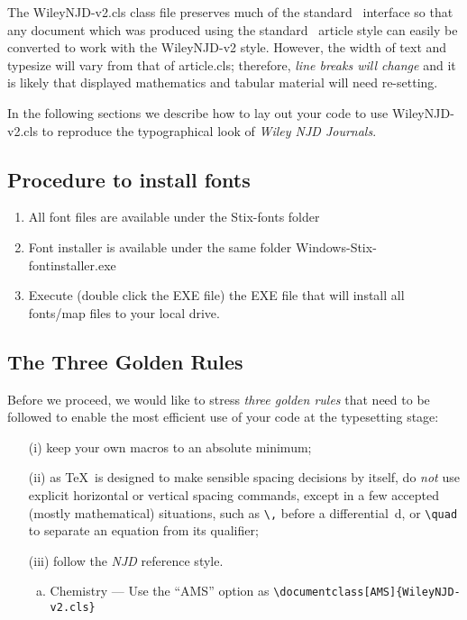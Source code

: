\documentclass[AMS,STIX1COL]{WileyNJD-v2}
\begin{document}
The \textsf{WileyNJD-v2.cls} class file preserves much of the standard
\LaTeXe\ interface so that any document which was produced using
the standard \LaTeXe\ \textsf{article} style can easily be
converted to work with the \textsf{WileyNJD-v2} style. However, the
width of text and typesize will vary from that of
\textsf{article.cls}; therefore, \emph{line breaks will change}
and it is likely that displayed mathematics and tabular material
will need re-setting.

In the following sections we describe how to lay out your code to
use \textsf{WileyNJD-v2.cls} to reproduce the typographical look of
\emph{Wiley NJD Journals}.

\subsection{Procedure to install fonts}
 
\begin{enumerate}
\item All font files are available under the Stix-fonts folder 
\item Font installer is available under the same folder Windows-Stix-fontinstaller.exe
\item Execute (double click the EXE file) the EXE file that will install all fonts/map files to your local drive.
\end{enumerate}

\subsection{The Three Golden Rules} 

Before we proceed, we would like to
stress \emph{three golden rules} that need to be followed to
enable the most efficient use of your code at the typesetting
stage:
\begin{enumerate}
\item[(i)] keep your own macros to an absolute minimum;

\item[(ii)] as \TeX\ is designed to make sensible spacing
decisions by itself, do \emph{not} use explicit horizontal or
vertical spacing commands, except in a few accepted (mostly
mathematical) situations, such as \verb"\," before a
differential~d, or \verb"\quad" to separate an equation from its
qualifier;

\item[(iii)] follow the \emph{NJD} reference style.
\begin{enumerate}[a.]
\item Chemistry --- Use the ``AMS'' option as \verb"\documentclass[AMS]{WileyNJD-v2.cls}"

\end{enumerate}
\end{enumerate}
\end{document}
